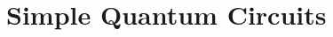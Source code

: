 \documentclass[twocolumn,nofootinbib,aps,,pra]{revtex4-1}
\newcommand{\ket}[1]{\ensuremath{\left|#1\right\rangle}}
\begin{document}
%

\section{Simple Quantum Circuits\label{S:basics}}
\end{document}

